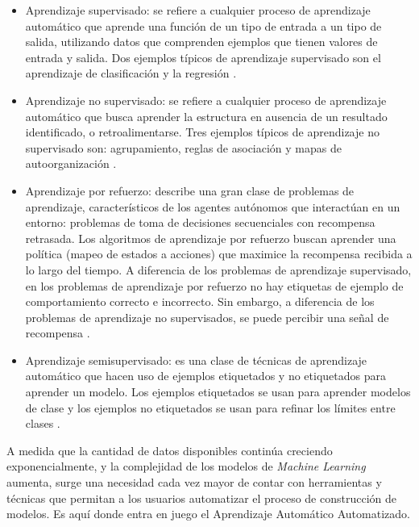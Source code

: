 \begin{itemize}
	\item Aprendizaje supervisado: se refiere a cualquier proceso de aprendizaje automático que aprende una función de un tipo de entrada a un tipo de salida, utilizando datos que comprenden ejemplos que tienen valores de entrada y salida. Dos ejemplos típicos de aprendizaje supervisado son el aprendizaje de clasificación y la regresión \citep{sammut2011encyclopedia}. 
	\item Aprendizaje no supervisado: se refiere a cualquier proceso de aprendizaje automático que busca aprender la estructura en ausencia de un resultado identificado, o retroalimentarse. Tres ejemplos típicos de aprendizaje no supervisado son: agrupamiento, reglas de asociación y mapas de autoorganización \citep{sammut2011encyclopedia}. 
	\item Aprendizaje por refuerzo: describe una gran clase de problemas de aprendizaje, característicos de los agentes autónomos que interactúan en un entorno: problemas de toma de decisiones secuenciales con recompensa retrasada. Los algoritmos de aprendizaje por refuerzo buscan aprender una política (mapeo de estados a acciones) que maximice la recompensa recibida a lo largo del tiempo. A diferencia de los problemas de aprendizaje supervisado, en los problemas de aprendizaje por refuerzo no hay etiquetas de ejemplo de comportamiento correcto e incorrecto. Sin embargo, a diferencia de los problemas de aprendizaje no supervisados, se puede percibir una señal de recompensa \citep{sammut2011encyclopedia}.
	\item Aprendizaje semisupervisado: es una clase de técnicas de aprendizaje automático que hacen uso de ejemplos etiquetados y no etiquetados para aprender un modelo. Los ejemplos etiquetados se usan para aprender modelos de clase y los ejemplos no etiquetados se usan para refinar los límites entre clases \citep{Han2011}.
\end{itemize}

A medida que la cantidad de datos disponibles continúa creciendo exponencialmente, y la complejidad de los modelos de \textit{Machine Learning }aumenta, surge una necesidad cada vez mayor de contar con herramientas y técnicas que permitan a los usuarios automatizar el proceso de construcción de modelos. Es aquí donde entra en juego el Aprendizaje Automático Automatizado.

